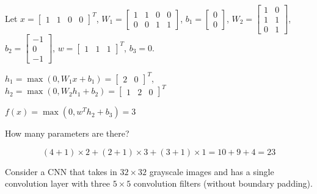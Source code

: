 \documentclass{article}
\begin{document}
\begin{probset}
\begin{prob}
\begin{subprobset}
\begin{subprob}
            \begin{soln}
                Let $x = \begin{bmatrix} 1 & 1 & 0 & 0 \end{bmatrix}^T$, $W_1 = \begin{bmatrix} 1 & 1 & 0 & 0 \\ 0 & 0 & 1 & 1 \end{bmatrix}$, $b_1 = \begin{bmatrix} 0 \\ 0 \end{bmatrix}$, $W_2 = \begin{bmatrix} 1 & 0 \\ 1 & 1 \\ 0 & 1 \end{bmatrix}$, $b_2 = \begin{bmatrix} -1 \\ 0 \\ -1 \end{bmatrix}$, $w = \begin{bmatrix} 1 & 1 & 1 \end{bmatrix}^T$, $b_3 = 0$.

                $h_1 = \max(0, W_1 x + b_1) = \begin{bmatrix} 2 & 0 \end{bmatrix}^T$, $h_2 = \max(0, W_2 h_1 + b_2) = \begin{bmatrix} 1 & 2 & 0 \end{bmatrix}^T$
                
                $f(x) = \max(0, w^T h_2 + b_3) = \boxed{3}$
            \end{soln}
        \end{subprob}

        \begin{subprob}
            How many parameters are there?

            \begin{soln}
                \[
                    (4 + 1) \times 2 + (2 + 1) \times 3 + (3 + 1) \times 1 = 10 + 9 + 4 = 23
                \]
            \end{soln}
        \end{subprob}
    \end{subprobset}
\end{prob}

\newpage

\begin{prob}
    Consider a CNN that takes in $32 \times 32$ grayscale images and has a single convolution layer with three $5 \times 5$ convolution filters (without boundary padding).


\end{prob}
\end{probset}
\end{document}
